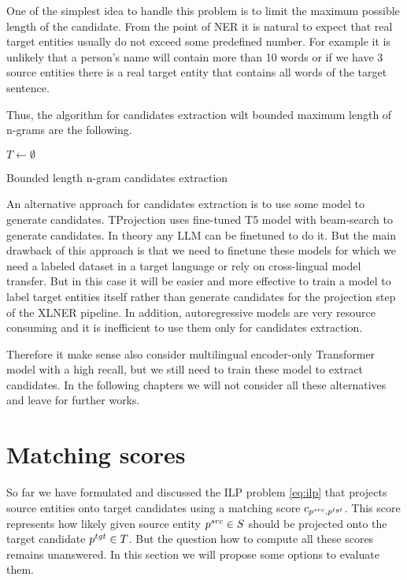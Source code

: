 One of the simplest idea to handle this problem is to limit the maximum possible length of the candidate.
From the point of NER it is natural to expect that real target entities usually do not exceed some
predefined number. For example it is unlikely that a person's name will contain more than 10 words or
if we have 3 source entities there is a real target entity that contains all words of the target sentence.

Thus, the algorithm for candidates extraction wilt bounded maximum length of n-grams are the following.
\begin{algorithm}

  \( T \gets \emptyset \) \;
  \caption{Bounded length n-gram candidates extraction}
  \label{alg:ngram_extraction}
\end{algorithm}

An alternative approach for candidates extraction is to use some model to generate candidates.
TProjection uses fine-tuned T5 model with beam-search to generate candidates. In theory any LLM can be finetuned
to do it. But the main drawback of this approach is that we need to finetune these models for which we need
a labeled dataset in a target language or rely on cross-lingual model transfer.
But in this case it will be easier and more effective to train a model to label
target entities itself rather than generate candidates for the projection step of the
XLNER pipeline. In addition, autoregressive models are very resource consuming and it is
inefficient to use them only for candidates extraction.

Therefore it make sense also consider multilingual encoder-only Transformer model with a high recall,
but we still need to train these model to extract candidates. In the following chapters we will not consider all
these alternatives and leave for further works.

\section{Matching scores}
So far we have formulated and discussed the ILP problem \eqref{eq:ilp} that projects source entities onto
target candidates using a matching score \( c_{p^{src}, p^{tgt}} \). This score represents
how likely given source entity \( p^{src} \in S \) should be projected onto the target candidate \( p^{tgt} \in T \).
But the question how to compute all these scores remains unanswered. In this section we will propose
some options to evaluate them.


